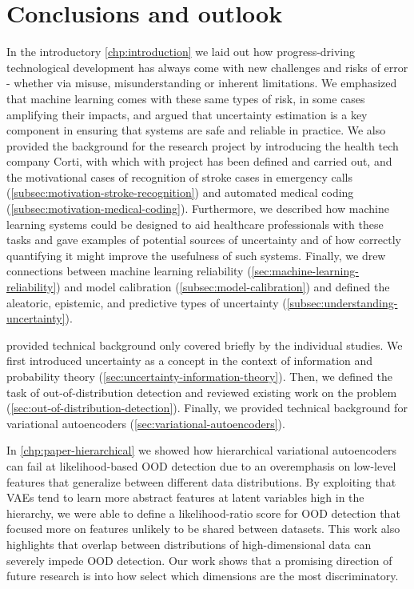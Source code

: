 
\chapter[conclusions and outlook]{Conclusions and outlook}\label{chp:conclusion}

In the introductory \cref{chp:introduction} we laid out how progress-driving technological development has always come with new challenges and risks of error - whether via misuse, misunderstanding or inherent limitations. We emphasized that machine learning comes with these same types of risk, in some cases amplifying their impacts, and argued that uncertainty estimation is a key component in ensuring that systems are safe and reliable in practice. We also provided the background for the research project by introducing the health tech company Corti, with which with project has been defined and carried out, and the motivational cases of recognition of stroke cases in emergency calls (\cref{subsec:motivation-stroke-recognition}) and automated medical coding (\cref{subsec:motivation-medical-coding}). Furthermore, we described how machine learning systems could be designed to aid healthcare professionals with these tasks and gave examples of potential sources of uncertainty and of how correctly quantifying it might improve the usefulness of such systems. Finally, we drew connections between machine learning reliability (\cref{sec:machine-learning-reliability}) and model calibration (\cref{subsec:model-calibration}) and defined the aleatoric, epistemic, and predictive types of uncertainty (\cref{subsec:understanding-uncertainty}).

 provided technical background only covered briefly by the individual studies. We first introduced uncertainty as a concept in the context of information and probability theory (\cref{sec:uncertainty-information-theory}). Then, we defined the task of out-of-distribution detection and reviewed existing work on the problem (\cref{sec:out-of-distribution-detection}). Finally, we provided technical background for variational autoencoders (\cref{sec:variational-autoencoders}).

In \cref{chp:paper-hierarchical} we showed how hierarchical variational autoencoders can fail at likelihood-based OOD detection due to an overemphasis on low-level features that generalize between different data distributions. By exploiting that VAEs tend to learn more abstract features at latent variables high in the hierarchy, we were able to define a likelihood-ratio score for OOD detection that focused more on features unlikely to be shared between datasets. 
This work also highlights that overlap between distributions of high-dimensional data can severely impede OOD detection. Our work shows that a promising direction of future research is into how select which dimensions are the most discriminatory.

